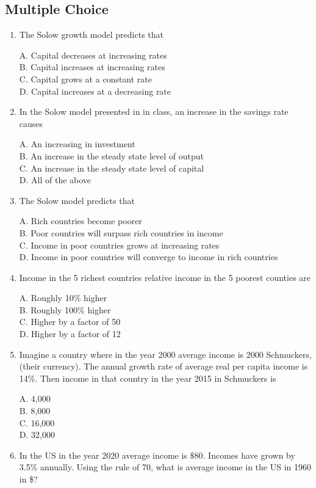 \documentclass[
]{book}
\begin{document}
\hypertarget{multiple-choice-1}{%
\subsection{Multiple Choice}\label{multiple-choice-1}}

\begin{enumerate}
\def\labelenumi{\arabic{enumi}.}
\item
  The Solow growth model predicts that

  A. Capital decreases at increasing rates\\
  B. Capital increases at increasing rates\\
  C. Capital grows at a constant rate\\
  D. Capital increases at a decreasing rate
\item
  In the Solow model presented in in class, an increase in the savings rate causes

  A. An increasing in investment\\
  B. An increase in the steady state level of output\\
  C. An increase in the steady state level of capital\\
  D. All of the above
\item
  The Solow model predicts that

  A. Rich countries become poorer\\
  B. Poor countries will surpass rich countries in income\\
  C. Income in poor countries grows at increasing rates\\
  D. Income in poor countries will converge to income in rich countries
\item
  Income in the 5 richest countries relative income in the 5 poorest counties are

  A. Roughly 10\% higher\\
  B. Roughly 100\% higher\\
  C. Higher by a factor of 50\\
  D. Higher by a factor of 12
\item
  Imagine a country where in the year 2000 average income is 2000 Schmuckers, (their currency). The annual growth rate of average real per capita income is 14\%. Then income in that country in the year 2015 in Schmuckers is

  A. 4,000\\
  B. 8,000\\
  C. 16,000\\
  D. 32,000
\item
  In the US in the year 2020 average income is \(\$80\). Incomes have grown by 3.5\% annually. Using the rule of 70, what is average income in the US in 1960 in \$?


\end{enumerate}
\end{document}
